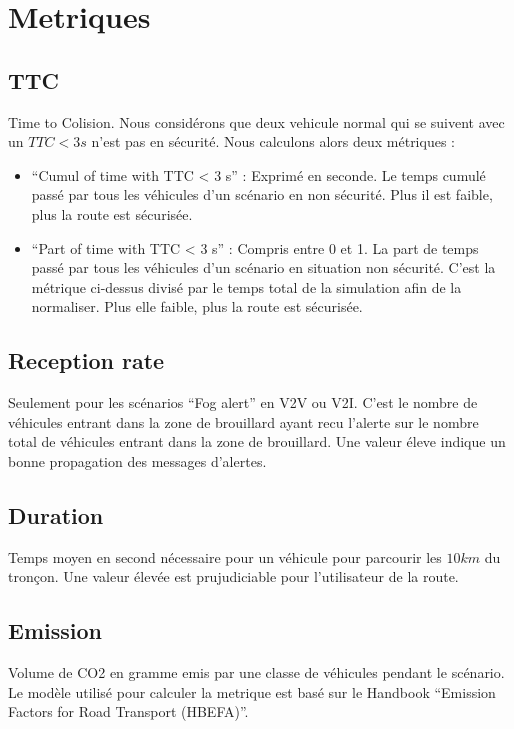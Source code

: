 \documentclass[a4paper,10pt]{report}
\begin{document}
\section*{Metriques}


\subsection*{TTC}

Time to Colision. Nous considérons que deux vehicule normal qui se suivent avec un $TTC < 3 s$  n'est pas en sécurité. Nous calculons alors deux métriques :

\begin{itemize}
 \item ``Cumul of time with TTC < 3 s'' : Exprimé en seconde. Le temps cumulé passé  par tous les véhicules d'un scénario en non sécurité. Plus il est faible, plus la route est sécurisée.
 \item ``Part of time with TTC < 3 s'' : Compris entre 0 et 1. La part de temps passé  par tous les véhicules d'un scénario en situation non sécurité. C'est la métrique ci-dessus divisé par le temps total de la simulation afin de la normaliser. Plus elle faible, plus la route est sécurisée.
\end{itemize}

\subsection*{Reception rate}

Seulement pour les scénarios ``Fog alert'' en V2V ou V2I. C'est le nombre de véhicules entrant dans la zone de brouillard ayant recu l'alerte sur le nombre total de véhicules entrant dans la zone de brouillard. Une valeur éleve indique un bonne propagation des messages d'alertes.

\subsection*{Duration}

Temps moyen en second nécessaire pour un véhicule pour parcourir les $10 km$ du tronçon. Une valeur élevée est prujudiciable pour l'utilisateur de la route.

\subsection*{Emission}

Volume de CO2 en gramme emis par une classe de véhicules pendant le scénario. Le modèle utilisé pour calculer la metrique est basé sur le Handbook ``Emission Factors for Road Transport (HBEFA)''.
\end{document}
